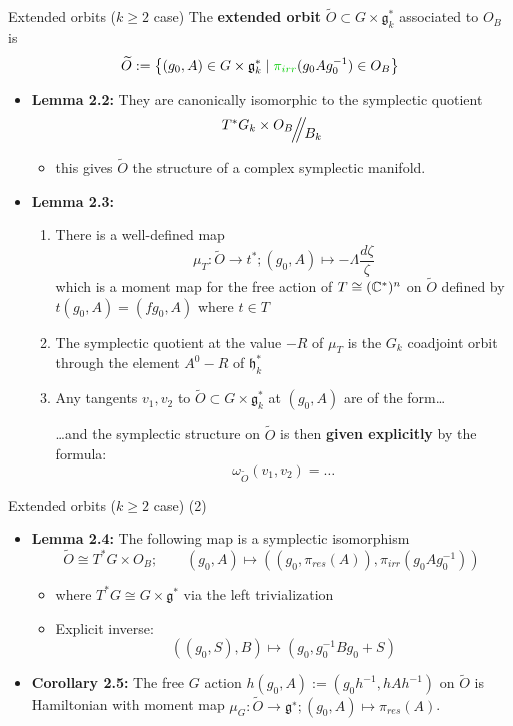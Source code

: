 \begin{frame}[fragile]{Extended orbits ($k\geq2$ case)}
  The \textbf{extended orbit} $\tilde O\subset G\times \mathfrak{g}_k^*$
  associated to $O_B$ is
  \[
    \tilde O:=\left\{(g_0,A)\in G\times\mathfrak{g}_k^*
    \mid\textcolor{green!80!black}{\pi_{irr}}(g_0Ag_0^{-1})\in O_B\right\}
  \]
  \begin{itemize}
    \item \textbf{Lemma 2.2:} They are canonically isomorphic to the symplectic
      quotient
      \[
        \symplquot{T^*G_k\times O_B}{B_k}
      \]
      \begin{itemize}
        \item this gives $\tilde O$ the structure of a complex symplectic
          manifold.
      \end{itemize}
    \item \textbf{Lemma 2.3:}
      \begin{enumerate}
        \item There is a well-defined map
          \[
            \mu_T: \tilde O \to t^*; (g_0,A)\mapsto
            -\Lambda\frac{d\zeta}{\zeta}
          \]
          which is a moment map for the free action of $T\cong(\mathbb{C}^*)^n$ on
          $\tilde O$ defined by $t(g_0,A)=(fg_0,A)$ where $t\in T$
        \item The symplectic quotient at the value $-R$ of $\mu_T$ is the
          $G_k$ coadjoint orbit through the element $A^0-R$ of
          $\mathfrak{h}_k^*$
        \item Any tangents $v_1,v_2$ to $\tilde O\subset G\times
          \mathfrak{g}_k^*$ at $(g_0,A)$ are of the form\dots

          \dots and the symplectic structure on $\tilde O$ is then
          \textbf{given explicitly} by the formula:
         \[
           \omega_{\tilde O}(v_1,v_2)=\dots
         \]
      \end{enumerate}
  \end{itemize}
\end{frame}

\begin{frame}{Extended orbits ($k\geq2$ case) (2)}
  \begin{itemize}
    \item \textbf{Lemma 2.4:} The following map is a symplectic isomorphism
      \[
        \tilde O\cong T^*G\times O_B;
        \qquad (g_0,A)\mapsto((g_0,\pi_{res}(A)),\pi_{irr}(g_0Ag_0^{-1}))
      \]
      \begin{itemize}
        \item where $T^*G\cong G\times\mathfrak{g}^*$ via the left
          trivialization
        \item Explicit inverse:
          \[
            ((g_0,S),B) \mapsto (g_0,g_0^{-1}Bg_0+S)
          \]
      \end{itemize}
    \item \textbf{Corollary 2.5:} The free $G$ action
      $h(g_0,A):=(g_0h^{−1},hAh^{−1})$ on $\tilde O$ is Hamiltonian with moment
      map $\mu_G:\tilde O \to\mathfrak{g}^∗; (g_0,A) \mapsto \pi_{res}(A)$.
  \end{itemize}
\end{frame}

